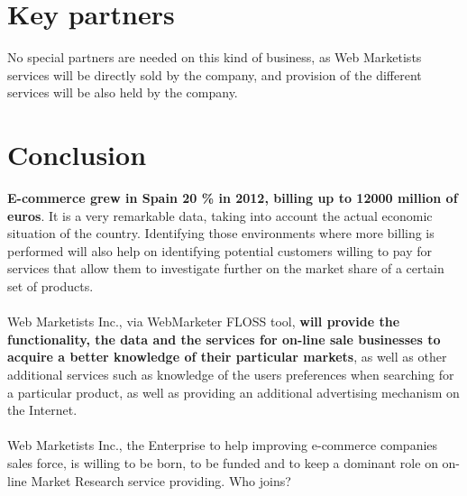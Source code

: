 \documentclass[11pt]{article}
\begin{document}
\section{Key partners}
No special partners are needed on this kind of business, as Web Marketists services will be directly sold by the company, and provision of the different services will be also held by the company.
\section{Conclusion}
\textbf{E-commerce grew in Spain 20 \% in 2012, billing up to 12000 million of euros}. It is a very remarkable data, taking into account the actual economic situation of the country. Identifying those environments where more billing is performed will also help on identifying potential customers willing to pay for services that allow them to investigate further on the market share of a certain set of products.\\
\\
Web Marketists Inc., via WebMarketer FLOSS tool, \textbf{will provide the functionality, the data and the services for on-line sale businesses to acquire a better knowledge of their particular markets}, as well as other additional services such as knowledge of the users preferences when searching for a particular product, as well as providing an additional advertising mechanism on the Internet.\\
\\
Web Marketists Inc., the Enterprise to help improving e-commerce companies sales force, is willing to be born, to be funded and to keep a dominant role on on-line Market Research service providing. Who joins?
\end{document}
